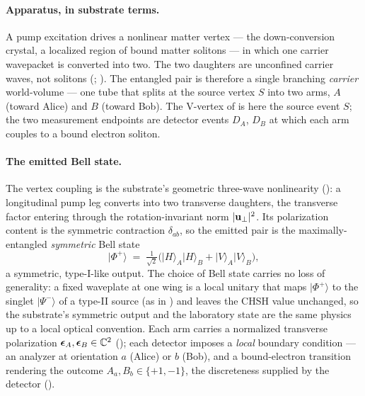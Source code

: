 \paragraph{Apparatus, in substrate terms.}
A pump excitation drives a nonlinear matter vertex --- the down-conversion crystal, a localized
region of bound matter solitons --- in which one carrier wavepacket is converted into two. The two
daughters are unconfined carrier waves, not solitons (;
). The entangled pair
is therefore a single branching \emph{carrier} world-volume --- one tube that splits at the source
vertex $S$ into two arms, $A$ (toward Alice) and $B$ (toward Bob). The V-vertex of
 is here the source event $S$; the two measurement endpoints are detector
events $D_A$, $D_B$ at which each arm couples to a bound electron soliton.

\paragraph{The emitted Bell state.}
The vertex coupling is the substrate's geometric three-wave nonlinearity
(): a longitudinal pump leg converts into two transverse daughters, the
transverse factor entering through the rotation-invariant norm $|\mathbf{u}_\perp|^2$. Its polarization
content is the symmetric contraction $\delta_{ab}$, so the emitted pair is the maximally-entangled
\emph{symmetric} Bell state
\begin{equation}
  \lvert\Phi^+\rangle \;=\; \tfrac{1}{\sqrt 2}\bigl(\lvert H\rangle_A\lvert H\rangle_B
    + \lvert V\rangle_A\lvert V\rangle_B\bigr),
  \label{eq:bellstate}
\end{equation}
a symmetric, type-I-like output. The choice of Bell state carries no loss of generality: a fixed
waveplate at one wing is a local unitary that maps $\lvert\Phi^+\rangle$ to the singlet
$\lvert\Psi^-\rangle$ of a type-II source (as in \citep{Kwiat1995}) and leaves the CHSH value
unchanged, so the substrate's symmetric output and the laboratory state are the same physics up to
a local optical convention. Each arm carries a normalized transverse polarization
$\bm{\epsilon}_A,\bm{\epsilon}_B\in\mathbb{C}^{2}$ ();
each detector imposes a \emph{local} boundary condition --- an analyzer at orientation $a$ (Alice)
or $b$ (Bob), and a bound-electron transition rendering the outcome $A_a,B_b\in\{+1,-1\}$, the
discreteness supplied by the detector ().

